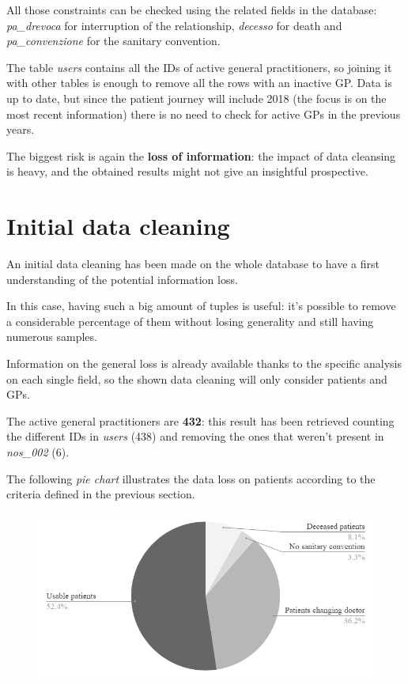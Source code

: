 All those constraints can be checked using the related fields in the database: \textit{pa\_drevoca} for interruption of the relationship, \textit{decesso} for death and \textit{pa\_convenzione} for the sanitary convention.

The table \textit{users} contains all the IDs of active general practitioners, so joining it with other tables is enough to remove all the rows with an inactive GP. Data is up to date, but since the patient journey will include 2018 (the focus is on the most recent information) there is no need to check for active GPs in the previous years.

The biggest risk is again the \textbf{loss of information}: the impact of data cleansing is heavy, and the obtained results might not give an insightful prospective.

\section{Initial data cleaning}
An initial data cleaning has been made on the whole database to have a first understanding of the potential information loss.

In this case, having such a big amount of tuples is useful: it's possible to remove a considerable percentage of them without losing generality and still having numerous samples.

Information on the general loss is already available thanks to the specific analysis on each single field, so the shown data cleaning will only consider patients and GPs.

The active general practitioners are \textbf{432}: this result has been retrieved counting the different IDs in \textit{users} (438) and removing the ones that weren't present in \textit{nos\_002} (6).

The following \textit{pie chart} illustrates the data loss on patients according to the criteria defined in the previous section.
\begin{figure}[h]
	\centering
	\includegraphics[scale=0.6]{immagini/pie0018.png}
\end{figure}

